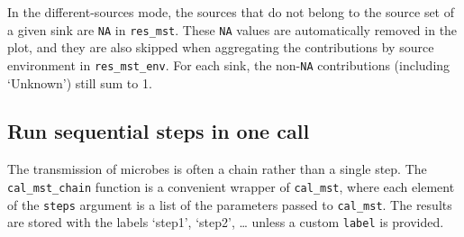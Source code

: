 \documentclass[
]{book}
\newenvironment{Shaded}{\begin{snugshade}}{\end{snugshade}}
\newcommand{\AttributeTok}[1]{\textcolor[rgb]{0.13,0.29,0.53}{#1}}
\newcommand{\CommentTok}[1]{\textcolor[rgb]{0.56,0.35,0.01}{\textit{#1}}}
\newcommand{\DecValTok}[1]{\textcolor[rgb]{0.00,0.00,0.81}{#1}}
\newcommand{\FunctionTok}[1]{\textcolor[rgb]{0.13,0.29,0.53}{\textbf{#1}}}
\newcommand{\NormalTok}[1]{#1}
\newcommand{\SpecialCharTok}[1]{\textcolor[rgb]{0.81,0.36,0.00}{\textbf{#1}}}
\newcommand{\StringTok}[1]{\textcolor[rgb]{0.31,0.60,0.02}{#1}}
\begin{document}
\begin{Shaded}
\end{Shaded}

In the different-sources mode, the sources that do not belong to the source set of a given sink are \texttt{NA} in \texttt{res\_mst}.
These \texttt{NA} values are automatically removed in the plot, and they are also skipped when aggregating
the contributions by source environment in \texttt{res\_mst\_env}.
For each sink, the non-\texttt{NA} contributions (including `Unknown') still sum to 1.

\subsection{Run sequential steps in one call}\label{run-sequential-steps-in-one-call}

The transmission of microbes is often a chain rather than a single step.
The \texttt{cal\_mst\_chain} function is a convenient wrapper of \texttt{cal\_mst},
where each element of the \texttt{steps} argument is a list of the parameters passed to \texttt{cal\_mst}.
The results are stored with the labels `step1', `step2', \ldots{} unless a custom \texttt{label} is provided.
\end{document}
